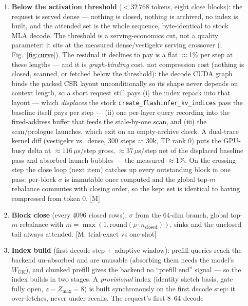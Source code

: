 
\begin{enumerate}
\item \textbf{Below the activation threshold} ($<32\,768$ tokens, eight
  close blocks): the request is served dense --- nothing is closed, nothing
  is archived, no index is built, and the attended set is the whole
  sequence, byte-identical to stock MLA decode. The threshold is a
  serving-economics cut, not a quality parameter: it sits at the measured
  dense/vestigekv serving crossover (\serveCrossover{};
  Fig.~\ref{fig:curve}). The residual it declines to pay is a flat
  $\approx$1\% per step at these lengths --- and it is \emph{graph-binding}
  cost, not compression cost (nothing is closed, scanned, or fetched below
  the threshold): the decode CUDA graph binds the packed CSR layout
  unconditionally so its shape never depends on context length, so a short
  request still pays (i) the index repack into that layout --- which
  \emph{displaces} the stock \texttt{create\_flashinfer\_kv\_indices} pass
  the baseline itself pays per step --- (ii) one per-layer query recording
  into the fixed-address buffer that feeds the stale-by-one scan, and
  (iii) the scan/prologue launches, which exit on an empty-archive check.
  A dual-trace kernel diff (vestigekv vs.\ dense, 300 steps at 30k,
  TP rank 0) puts the GPU-busy delta at ${\approx}116\,\mu$s/step gross,
  ${\approx}37\,\mu$s/step net of the displaced baseline pass and absorbed
  launch bubbles --- the measured ${\approx}$1\%. On the crossing step the
  close loop (next item) catches up every outstanding block in one pass;
  per-block $\sigma$ is immutable once computed and the global top-$m$
  rebalance commutes with closing order, so the kept set is identical to
  having compressed from token 0. [M]
\item \textbf{Block close} (every 4096 closed rows): $\sigma$ from the
  64-dim branch, global top-$m$ rebalance with
  $m=\max(1,\mathrm{round}(\rho\cdot n_{\mathrm{closed}}))$, sinks and the
  unclosed tail always
  attended. [M: trial-exact vs one-shot]
\item \textbf{Index build} (first decode step $+$ adaptive window): prefill
  queries reach the backend un-absorbed and are unusable (absorbing them
  needs the model's $W_{UK}$), and chunked prefill gives the backend no
  ``prefill end'' signal --- so the index builds in two stages. A
  \emph{provisional} index (identity sketch basis, gate fully open,
  $z=Z_{\max}=8$) is built synchronously on the first decode step: it
  over-fetches, never under-recalls. The request's first 8--64 decode

\end{enumerate}
